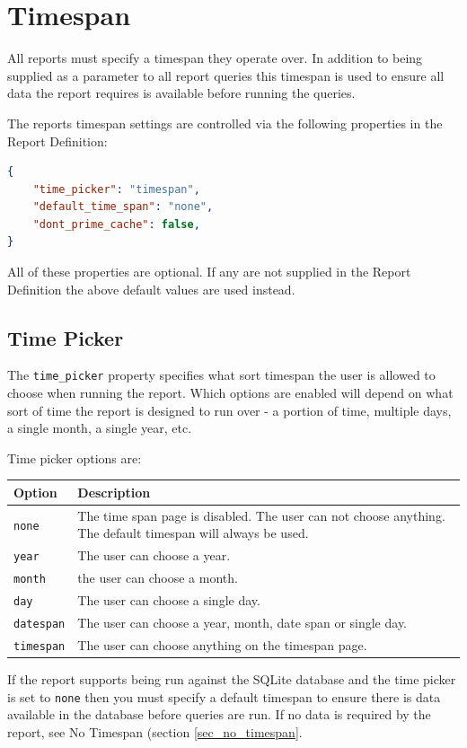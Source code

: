 \documentclass[a4paper,10pt]{book}
\begin{document}
\section{Timespan}
All reports must specify a timespan they operate over. In addition to being supplied as a parameter to all report queries this timespan is used to ensure all data the report requires is available before running the queries.

The reports timespan settings are controlled via the following properties in the Report Definition:
\begin{lstlisting}[language=json]
{
	"time_picker": "timespan",
	"default_time_span": "none",
	"dont_prime_cache": false,
}
\end{lstlisting}

All of these properties are optional. If any are not supplied in the Report Definition the above default values are used instead.

\subsection{Time Picker}
The \verb|time_picker| property specifies what sort timespan the user is allowed to choose when running the report. Which options are enabled will depend on what sort of time the report is designed to run over - a portion of time, multiple days, a single month, a single year, etc.

Time picker options are:

\begin{tabular}{p{2.5cm} p{11.5cm}}
\hline
\textbf{Option} & \textbf{Description} \\
\hline
\verb|none| & The time span page is disabled. The user can not choose anything. The default timespan will always be used.\\
\verb|year| & The user can choose a year.\\
\verb|month| & the user can choose a month.\\
\verb|day| & The user can choose a single day.\\
\verb|datespan| & The user can choose a year, month, date span or single day.\\
\verb|timespan| & The user can choose anything on the timespan page. \\
\hline
\end{tabular}

If the report supports being run against the SQLite database and the time picker is set to \verb|none| then you must specify a default timespan to ensure there is data available in the database before queries are run. If no data is required by the report, see No Timespan (section \ref{sec_no_timespan}.
\end{document}
